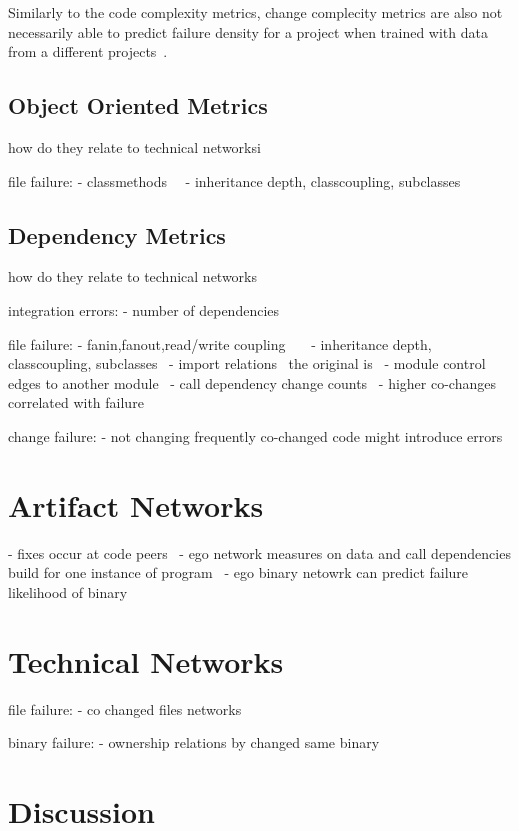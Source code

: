 Similarly to the code complexity metrics, change complecity metrics are also not necessarily able to predict failure density for a project when trained with data from a different projects~\cite{zimmermann:fse:2009}.


\subsection{Object Oriented Metrics}
how do they relate to technical networksi

file failure:
- classmethods~\cite{nagappan:icse:2006}~\cite{arisholm:isese:2006}
- inheritance depth, classcoupling, subclasses~\cite{nagappan:icse:2006}~\cite{arisholm:isese:2006}~\cite{english:promise:2009}

\subsection{Dependency Metrics}
how do they relate to technical networks

integration errors:
- number of dependencies~\cite{cataldo:icse:2011}

file failure:
- fanin,fanout,read/write coupling~\cite{nagappan:icse:2006}~\cite{arisholm:isese:2006}~\cite{knab:msr:2006}
- inheritance depth, classcoupling, subclasses~\cite{nagappan:icse:2006}
- import relations~\cite{dualaekoko:esem:2009} the original is~\cite{schroeter:isese:2006}
- module control edges to another module~\cite{jiang:promise:2008}
- call dependency change counts~\cite{shin:msr:2009}
- higher co-changes correlated with failure~\cite{dambros:wcre:2009}

change failure:
- not changing frequently co-changed code might introduce errors~\cite{zimmermann:icse:2004}


\section{Artifact Networks}
\label{chap:6:an}

- fixes occur at code peers~\cite{nguyen:icse:2010} 
- ego network measures on data and call dependencies build for one instance of program~\cite{zimmermann:icse:2008}
- ego binary netowrk can predict failure likelihood of binary~\cite{zimmermann:esem:2009}

\section{Technical Networks}
\label{chap:6:tn}
file failure:
- co changed files networks~\cite{meneely:fse:2008}

binary failure:
- ownership relations by changed same binary~\cite{pinzger:fse:2008}


\section{Discussion}
\label{chap:6:dis}
